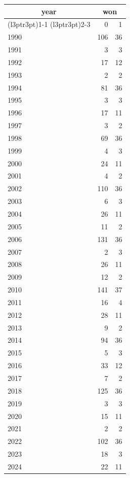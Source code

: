 \footnotesize\begin{tabular}[t]{lrr}
\toprule
\multicolumn{1}{c}{year} & \multicolumn{2}{c}{won} \\
\cmidrule(l{3pt}r{3pt}){1-1} \cmidrule(l{3pt}r{3pt}){2-3}
  & 0 & 1\\
\midrule
1990 & 106 & 36\\
1991 & 3 & 3\\
1992 & 17 & 12\\
1993 & 2 & 2\\
1994 & 81 & 36\\
1995 & 3 & 3\\
1996 & 17 & 11\\
1997 & 3 & 2\\
1998 & 69 & 36\\
1999 & 4 & 3\\
2000 & 24 & 11\\
2001 & 4 & 2\\
2002 & 110 & 36\\
2003 & 6 & 3\\
2004 & 26 & 11\\
2005 & 11 & 2\\
2006 & 131 & 36\\
2007 & 2 & 3\\
2008 & 26 & 11\\
2009 & 12 & 2\\
2010 & 141 & 37\\
2011 & 16 & 4\\
2012 & 28 & 11\\
2013 & 9 & 2\\
2014 & 94 & 36\\
2015 & 5 & 3\\
2016 & 33 & 12\\
2017 & 7 & 2\\
2018 & 125 & 36\\
2019 & 3 & 3\\
2020 & 15 & 11\\
2021 & 2 & 2\\
2022 & 102 & 36\\
2023 & 18 & 3\\
2024 & 22 & 11\\
\bottomrule
\end{tabular}
